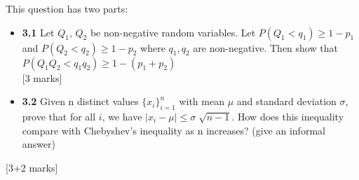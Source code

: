 \begin{que}
	This question has two parts:
	\begin{itemize}
		\item \textbf{3.1} Let $Q_{1}$, $Q_{2}$ be non-negative random variables. Let $P(Q_1 < q_1) \geq 1-p_1$ and $P(Q_2 < q_2) \geq 1-p_2$
		      where $q_1, q_2$ are non-negative. Then show that $P(Q_1Q_2 < q_1q_2) \geq 1 - (p_1 + p_2)$\\
		      \hspace*{\fill} [3 marks]
		\item \textbf{3.2} Given n distinct values ${\{x_i\}}^n_{i=1}$ with mean $\mu$ and standard deviation $\sigma$, prove that for all $i$,
		      we have $|x_i - \mu| \leq \sigma \sqrt[]{n-1}$. How does this inequality compare with Chebyshev's inequality as n
		      increases? (give an informal answer)
	\end{itemize}
	\hspace*{\fill} [3+2 marks]
\end{que}

